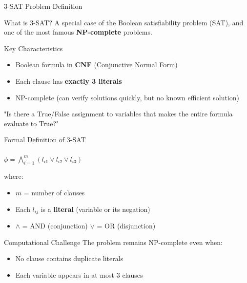 \documentclass{beamer}
\begin{document}
\begin{frame}{3-SAT Problem Definition}
    \begin{block}{What is 3-SAT?}
        A special case of the Boolean satisfiability problem (SAT), and one of the most famous \textbf{NP-complete} problems.
    \end{block}
    
    \begin{alertblock}{Key Characteristics}
        \begin{itemize}
            \item Boolean formula in \textbf{CNF} (Conjunctive Normal Form)
            \item Each clause has \textbf{exactly 3 literals}
            \item NP-complete (can verify solutions quickly, but no known efficient solution)
        \end{itemize}
        \textbf{\color{myred}{Decision Problem:}}
        "Is there a True/False assignment to variables that makes the entire formula evaluate to True?"
    \end{alertblock}
\end{frame}

\begin{frame}{Formal Definition of 3-SAT}
        \textbf{\color{myred}{Mathematical Representation}} \\
        \color{black}{Given a formula $\phi$ in 3-CNF form:}\\
         \centering $\phi = \bigwedge_{i=1}^m (l_{i1} \lor l_{i2} \lor l_{i3})$ \\
        \begin{flushleft} where:
            \begin{itemize}
                \item $m$ = number of clauses
                \item Each $l_{ij}$ is a \textbf{literal} (variable or its negation)
                \item $\land$ = AND (conjunction) $\lor$ = OR (disjunction)
            \end{itemize}

            \begin{alertblock}{Computational Challenge}
            The problem remains NP-complete even when:
                \begin{itemize}
                    \item No clause contains duplicate literals
                    \item Each variable appears in at most 3 clauses
                \end{itemize}
             \end{alertblock}
        \end{flushleft}
\end{frame}
\end{document}
